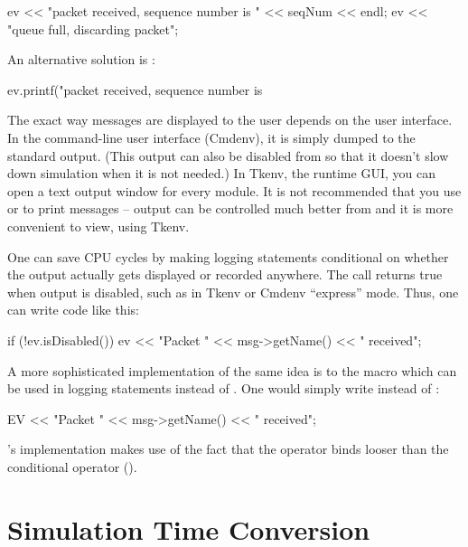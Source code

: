 \begin{cpp}
ev << "packet received, sequence number is " << seqNum << endl;
ev << "queue full, discarding packet\n";
\end{cpp}

An alternative solution is :

\begin{cpp}
ev.printf("packet received, sequence number is %
\end{cpp}

The exact way messages are displayed to the user depends on the user
interface. In the command-line user interface (Cmdenv),
it is simply dumped to the standard output. (This output can also be
disabled from  so that it doesn't slow down simulation
when it is not needed.) In Tkenv, the runtime GUI, you can open
a text output window for every module.
It is not recommended that you use  or 
to print messages --  output can be controlled much better
from  and it is more convenient to view, using Tkenv.

One can save CPU cycles by making logging statements conditional
on whether the output actually gets displayed or recorded anywhere.
The  call returns true when  output is disabled,
such as in Tkenv or Cmdenv ``express'' mode. Thus, one can write code like
this:

\begin{cpp}
if (!ev.isDisabled())
    ev << "Packet " << msg->getName() << " received\n";
\end{cpp}

A more sophisticated implementation of the same idea is to the 
macro which can be used in logging statements instead of .
One would simply write  instead of :

\begin{cpp}
EV << "Packet " << msg->getName() << " received\n";
\end{cpp}

's implementation makes use of the fact that the \ttt{<<} operator
binds looser than the conditional operator ().



\section{Simulation Time Conversion}

